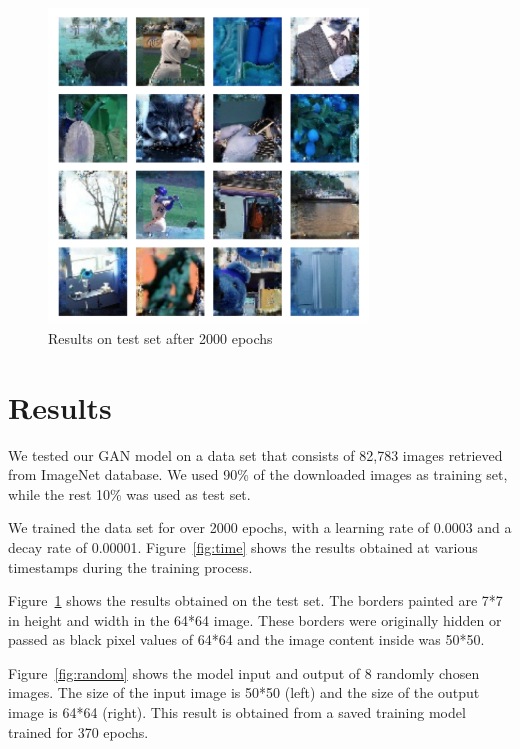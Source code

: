 \documentclass{sig-alternate}
\begin{document}
\begin{figure}[htb]
	\centering
	\includegraphics[width=8.5cm]{outResults}
	\caption{Results on test set after 2000 epochs}
	\label{fig:res}
\end{figure}

\section{Results}

We tested our GAN model on a data set that consists of 82,783 images retrieved from ImageNet database. We used 90\% of the downloaded images as training set, while the rest 10\% was used as test set.

We trained the data set for over 2000 epochs, with a learning rate of 0.0003 and a decay rate of 0.00001. Figure~\ref{fig:time} shows the results obtained at various timestamps during the training process.

Figure~\ref{fig:res} shows the results obtained on the test set. The borders painted are 7*7 in height and width in the 64*64 image. These borders were originally hidden or passed as black pixel values of 64*64 and the image content inside was 50*50.

Figure~\ref{fig:random} shows the model input and output of 8 randomly chosen images. The size of the input image is 50*50 (left) and the size of the output image is 64*64 (right). This result is obtained from a saved training model trained for 370 epochs.
\end{document}
